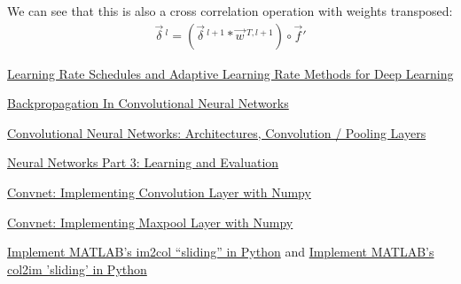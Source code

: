 \documentclass{article}
\begin{document}
We can see that this is also a cross correlation operation with weights transposed:
\begin{gather*}
\vec\delta\,^l=(\vec \delta\,^{l+1}*\vec w\,^{T,l+1})\circ \vec f'
\end{gather*}
\begin{thebibliography}{}
\bibitem{} 
\href{https://medium.com/towards-data-science/ learning-rate-schedules-and-adaptive-learning-rate-methods-for-deep-learning-2c8f433990d1}{Learning Rate Schedules and Adaptive Learning Rate Methods for Deep Learning}

 
\bibitem{} 
\href{http://www.jefkine.com/general/2016/09/05/backpropagation-in-convolutional-neural-networks/}{Backpropagation In Convolutional Neural Networks}

\bibitem{} 
\href{http://cs231n.github.io/convolutional-networks/}{Convolutional Neural Networks: Architectures, Convolution / Pooling Layers}

\bibitem{}
\href{http://cs231n.github.io/neural-networks-3/}{Neural Networks Part 3: Learning and Evaluation}

\bibitem{}
\href{https://wiseodd.github.io/techblog/2016/07/16/convnet-conv-layer/}{Convnet: Implementing Convolution Layer with Numpy}

\bibitem{}
\href{https://wiseodd.github.io/techblog/2016/07/18/convnet-maxpool-layer/}{Convnet: Implementing Maxpool Layer with Numpy}

\bibitem{}
\href{https://stackoverflow.com/questions/30109068/implement-matlabs-im2col-sliding-in-python}{Implement MATLAB's im2col ``sliding'' in Python} and \href{https://stackoverflow.com/questions/42474491/implement-matlabs-col2im-sliding-in-python}{Implement MATLAB's col2im 'sliding' in Python}
\end{thebibliography}
\end{document}
